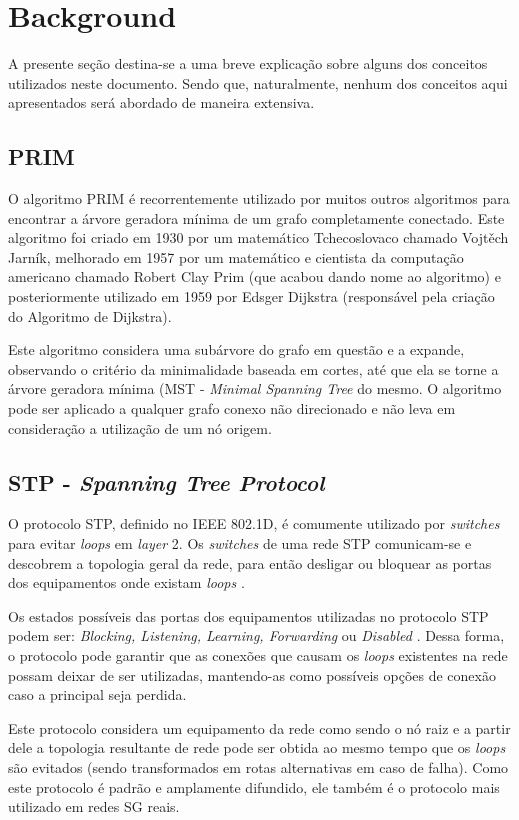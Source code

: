 \documentclass[12pt]{article}
\begin{document}
\section{Background}

A presente seção destina-se a uma breve explicação sobre alguns dos conceitos utilizados neste documento. Sendo que, naturalmente, nenhum dos conceitos aqui apresentados será abordado de maneira extensiva.

\subsection{PRIM}
\label{subsec:Prim}
O algoritmo PRIM é recorrentemente utilizado por muitos outros algoritmos para encontrar a árvore geradora mínima de um grafo completamente conectado. Este algoritmo foi criado em 1930 por um matemático Tchecoslovaco chamado Vojtěch Jarník, melhorado em 1957 por um matemático e cientista da computação americano chamado Robert Clay Prim (que acabou dando nome ao algoritmo) e posteriormente utilizado em 1959 por Edsger Dijkstra (responsável pela criação do Algoritmo de Dijkstra).

Este algoritmo considera uma subárvore do grafo em questão e a expande, observando o critério da minimalidade baseada em cortes, até que ela se torne a árvore geradora mínima (MST - \emph{Minimal Spanning Tree} do mesmo. O algoritmo pode ser aplicado a qualquer grafo conexo não direcionado e não leva em consideração a utilização de um nó origem.

\subsection{STP - \emph{Spanning Tree Protocol}}
\label{subsec:STP}
O protocolo STP, definido no IEEE 802.1D, é comumente utilizado por \emph{switches} para evitar \emph{loops} em \emph{layer} 2. Os \emph{switches} de uma rede STP comunicam-se e descobrem a topologia geral da rede, para então desligar ou bloquear as portas dos equipamentos onde existam \emph{loops} \cite{Art_Krishnan}.

Os estados possíveis das portas dos equipamentos utilizadas no protocolo STP podem ser: \emph{Blocking, Listening, Learning, Forwarding} ou \emph{Disabled} \cite{Art_Wojdak}. Dessa forma, o protocolo pode garantir que as conexões que causam os \emph{loops} existentes na rede possam deixar de ser utilizadas, mantendo-as como possíveis opções de conexão caso a principal seja perdida.

Este protocolo considera um equipamento da rede como sendo o nó raiz e a partir dele a topologia resultante de rede pode ser obtida ao mesmo tempo que os \emph{loops} são evitados (sendo transformados em rotas alternativas em caso de falha). Como este protocolo é padrão e amplamente difundido, ele também é o protocolo mais utilizado em redes SG reais.
\end{document}
